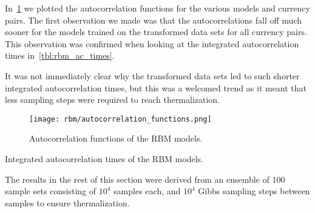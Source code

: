 In~\cref{fig:rbm_autocorrelation_functions} we plotted the autocorrelation functions for the various models and currency pairs.
The first observation we made was that the autocorrelations fall off much sooner for the models trained on the transformed data sets for all currency pairs.
This observation was confirmed when looking at the integrated autocorrelation times in~\cref{tbl:rbm_ac_times}.

It was not immediately clear why the transformed data sets led to such shorter integrated autocorrelation times, but this was a welcomed trend as it meant that less sampling steps were required to reach thermalization.
\begin{figure}[!htb]
    \begin{center}
        \texttt{[image: rbm/autocorrelation\_functions.png]}
    \end{center}
    \caption{
        Autocorrelation functions of the RBM models.
    }
    \label{fig:rbm_autocorrelation_functions}
\end{figure}
\begin{table}[!htb]
    \centering
    \begin{adjustbox}{max width=\textwidth}
        
    \end{adjustbox}
    \caption{
        Integrated autocorrelation times of the RBM models.
    }
    \label{tbl:rbm_ac_times}
\end{table}

The results in the rest of this section were derived from an ensemble of 100 sample sets consisting of \( 10^4 \) samples each, and \( 10^4 \) Gibbs sampling steps between samples to ensure thermalization.

